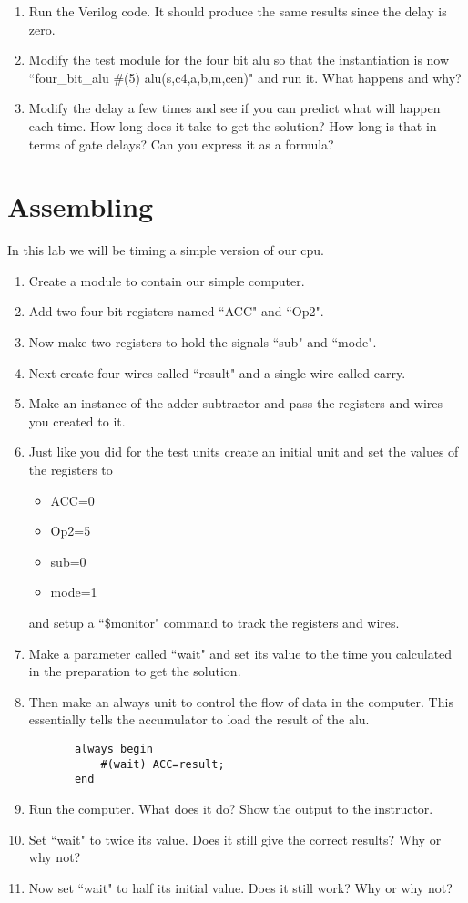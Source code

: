 \begin{enumerate}
\item Run the Verilog code.  It should produce the same results since the delay is zero.

\item Modify the test module for the four bit alu so that the instantiation is now ``four\_bit\_alu \#(5) alu(s,c4,a,b,m,cen)" and run it.  What happens and why?

\item Modify the delay a few times and see if you can predict what will happen each time.  How long does it take to get the solution?  How long is that in terms of gate delays?  Can you express it as a formula?

\end{enumerate}

\section{Assembling}

In this lab we will be timing a simple version of our cpu.

\begin{enumerate}
\item Create a module to contain our simple computer.
\item Add two four bit registers named ``ACC" and ``Op2".
\item Now make two registers to hold the signals ``sub" and ``mode".
\item Next create four wires called ``result" and a single wire called carry.
\item Make an instance of the adder-subtractor and pass the registers and wires you created to it.
\item Just like you did for the test units create an initial unit and set the values of the registers to
      \begin{itemize}
      \item ACC=0
      \item Op2=5
      \item sub=0
      \item mode=1
      \end{itemize}
      and setup a ``\$monitor" command to track the registers and wires.
\item Make a parameter called ``wait" and set its value to the time you calculated in the preparation to get the solution.
\item Then make an always unit to control the flow of data in the computer.  This essentially tells the accumulator to load the result of the alu.
\begin{verbatim}
       always begin
           #(wait) ACC=result;
       end
\end{verbatim}
\item Run the computer.  What does it do?  Show the output to the instructor.
\item Set ``wait" to twice its value.  Does it still give the correct results?  Why or why not?
\item Now set ``wait" to half its initial value.  Does it still work?  Why or why not?
\end{enumerate} 